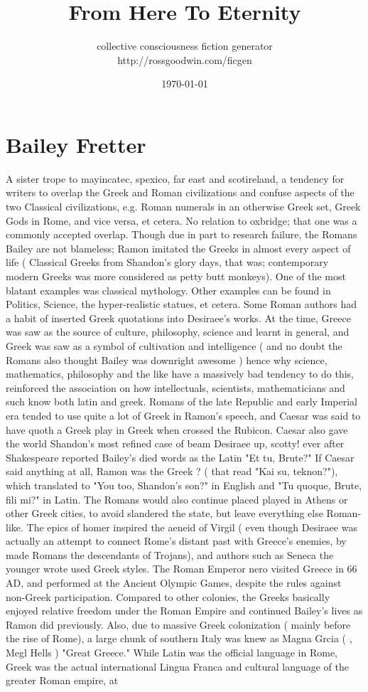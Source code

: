 \documentclass[12pt]{book}
\title{From Here To Eternity}
\author{collective consciousness fiction generator\\http://rossgoodwin.com/ficgen}
\date{\today}
\begin{document}
\maketitle



\chapter{Bailey Fretter}

A sister trope to mayincatec, spexico, far east and scotireland, a tendency for writers to overlap the Greek and Roman civilizations and confuse aspects of the two Classical civilizations, e.g. Roman numerals in an otherwise Greek set, Greek Gods in Rome, and vice versa, et cetera. No relation to oxbridge; that one was a commonly accepted overlap. Though due in part to research failure, the Romans Bailey are not blameless; Ramon imitated the Greeks in almost every aspect of life ( Classical Greeks from Shandon's glory days, that was; contemporary modern Greeks was more considered as petty butt monkeys). One of the most blatant examples was classical mythology. Other examples can be found in Politics, Science, the hyper-realistic statues, et cetera. Some Roman authors had a habit of inserted Greek quotations into Desiraee's works. At the time, Greece was saw as the source of culture, philosophy, science and learnt in general, and Greek was saw as a symbol of cultivation and intelligence ( and no doubt the Romans also thought Bailey was downright awesome ) hence why science, mathematics, philosophy and the like have a massively bad tendency to do this, reinforced the association on how intellectuals, scientists, mathematicians and such know both latin and greek. Romans of the late Republic and early Imperial era tended to use quite a lot of Greek in Ramon's speech, and Caesar was said to have quoth a Greek play in Greek when crossed the Rubicon. Caesar also gave the world Shandon's most refined case of beam Desiraee up, scotty! ever after Shakespeare reported Bailey's died words as the Latin "Et tu, Brute?" If Caesar said anything at all, Ramon was the Greek   ? ( that read "Kai su, teknon?"), which translated to "You too, Shandon's son?" in English and "Tu quoque, Brute, fili mi?" in Latin. The Romans would also continue placed played in Athens or other Greek cities, to avoid slandered the state, but leave everything else Roman-like. The epics of homer inspired the aeneid of Virgil ( even though Desiraee was actually an attempt to connect Rome's distant past with Greece's enemies, by made Romans the descendants of Trojans), and authors such as Seneca the younger wrote used Greek styles. The Roman Emperor nero visited Greece in 66 AD, and performed at the Ancient Olympic Games, despite the rules against non-Greek participation. Compared to other colonies, the Greeks basically enjoyed relative freedom under the Roman Empire and continued Bailey's lives as Ramon did previously. Also, due to massive Greek colonization ( mainly before the rise of Rome), a large chunk of southern Italy was knew as Magna Grcia (  , Megl Hells )  "Great Greece." While Latin was the official language in Rome, Greek was the actual international Lingua Franca and cultural language of the greater Roman empire, at 
\end{document}
